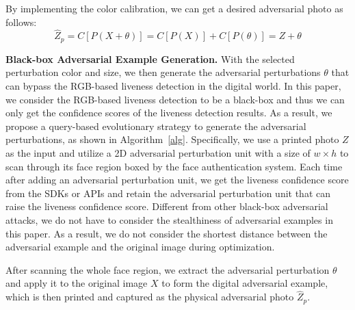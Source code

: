 By implementing the color calibration, we can get a desired adversarial photo as follows:
\begin{equation}
	\widehat{Z}_p=C[P(X+\theta)] =C[P(X)]+C[P(\theta)]=Z+\theta\label{rgb_3}
\end{equation}

\textbf{Black-box Adversarial Example Generation.}
With the selected perturbation color and size, we then generate the adversarial perturbations $\theta$ that can bypass the RGB-based liveness detection in the digital world.
In this paper, we consider the RGB-based liveness detection to be a black-box and thus we can only get the confidence scores of the liveness detection results. As a result, we propose a query-based evolutionary strategy to generate the adversarial perturbations, as shown in Algorithm~\ref{alg}.
Specifically, we use a printed photo $Z$ as the input and utilize a 2D adversarial perturbation unit with a size of $w\times h$  to scan through its face region boxed by the face authentication system. Each time after adding an adversarial perturbation unit, we get the liveness confidence score from the SDKs or APIs and retain the adversarial perturbation unit that can raise the liveness confidence score. 
Different from other black-box adversarial attacks, we do not have to consider the stealthiness of adversarial examples in this paper. As a result, we do not consider the shortest distance between the adversarial example and the original image during optimization. 

After scanning the whole face region, we extract the adversarial perturbation $\theta$ and apply it to the original image $X$ to form the digital adversarial example,  which is then printed and captured as the physical adversarial photo $\widehat{Z}_p$. 

